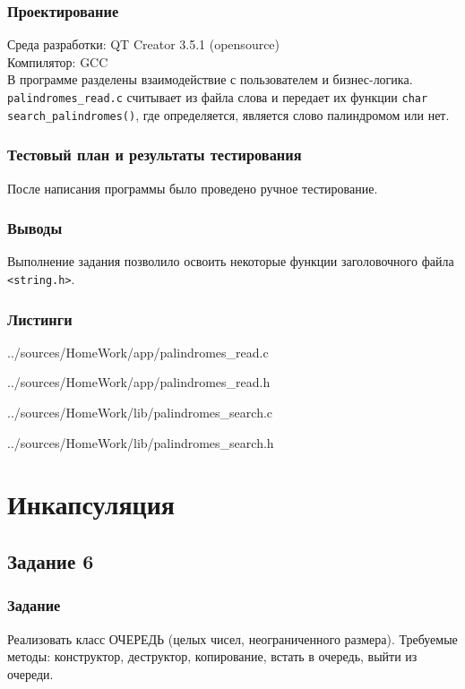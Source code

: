 \documentclass[12pt,a4paper]{report}
\begin{document}
\subsection{Проектирование}
Среда разработки: QT Creator 3.5.1 (opensource)
\\
Компилятор: GCC
\\
В программе разделены взаимодействие с пользователем и бизнес-логика. \verb+palindromes_read.c+ считывает из файла слова и передает их функции \verb+char search_palindromes()+, где определяется, является слово палиндромом или нет. 

\subsection{Тестовый план и результаты тестирования}
После написания программы было проведено ручное тестирование.


\subsection{Выводы}
Выполнение задания позволило освоить некоторые функции заголовочного файла \verb+<string.h>+.

\subsection*{Листинги}


{../sources/HomeWork/app/palindromes_read.c}


{../sources/HomeWork/app/palindromes_read.h}


{../sources/HomeWork/lib/palindromes_search.c}


{../sources/HomeWork/lib/palindromes_search.h}


\chapter{Инкапсуляция}
\section{Задание 6}
\subsection{Задание}
Реализовать класс ОЧЕРЕДЬ (целых чисел, неограниченного размера). Требуемые методы: конструктор, деструктор, копирование, встать в очередь, выйти из очереди.
\end{document}
